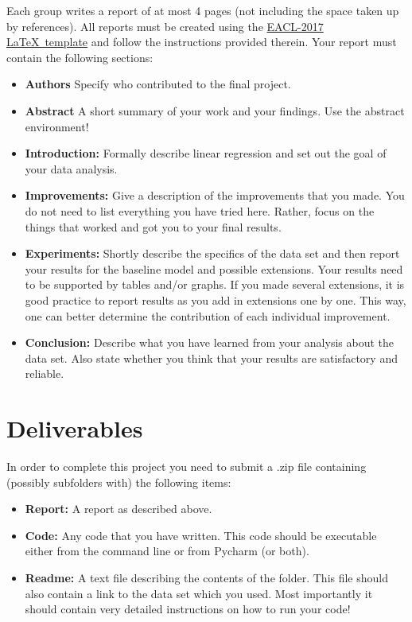 \documentclass[11pt, leqno, a4paper]{article}
\begin{document}
Each group writes a report of at most 4 pages (not including the space
taken up by references). All reports must be created using the 
\href{http://eacl2017.org/images/site/eacl-2017-template.zip}{EACL-2017 \LaTeX \ template} and follow the instructions provided therein. Your report must
contain the following sections:
\begin{itemize}
\item \textbf{Authors} Specify who contributed to the final project.
\item \textbf{Abstract} A short summary of your work and your findings. Use the abstract environment!
\item \textbf{Introduction:} Formally describe linear regression and set out the goal of your data
analysis.
\item \textbf{Improvements:} Give a description of the improvements that you made. You do not
need to list everything you have tried here. Rather, focus on the things that worked and got you to
your final results.
\item \textbf{Experiments:} Shortly describe the specifics of the data set and then report your results for the baseline model
and possible extensions. Your results need to be supported by tables and/or graphs. If you made several
extensions, it is good practice to report results as you add in extensions one by one. This way, one can
better determine the contribution of each individual improvement.
\item \textbf{Conclusion:} Describe what you have learned from your analysis about the data set. Also
state whether you think that your results are satisfactory and reliable.
\end{itemize}

\section{Deliverables}
In order to complete this project you need to submit a .zip file
containing (possibly subfolders with) the following items:
\begin{itemize}
\item \textbf{Report:} A report as described above.
\item \textbf{Code:} Any code that you have written. This code should be executable either from the command line or from Pycharm (or both).
\item \textbf{Readme:} A text file describing the contents of the folder. This file should also contain a link to the data set which you used. Most importantly
it should contain very detailed instructions on how to run your code!
\end{itemize}
\end{document}
